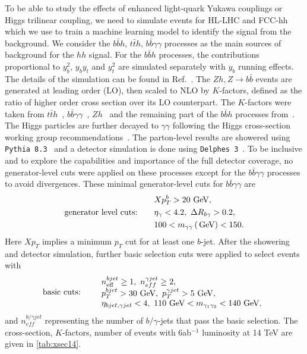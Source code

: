 To be able to study the effects of enhanced light-quark Yukawa couplings or Higgs trilinear coupling, we need to simulate events for HL-LHC and FCC-hh which we use to train a machine learning model to identify the signal from the background. We consider the $b\bar bh$, $t\bar th$, $b\bar b \gamma\gamma$ processes as the main sources of background for the $hh$ signal. For the $b\bar bh$ processes, the contributions proportional to $y_b^2$, $y_by_t$ and $y_t^2$ are simulated separately with $y_b$ running effects. The details of the simulation can be found in Ref.~\cite{Grojean:2020ech}. The $Zh, Z\to b\bar b$ events are generated at leading order (LO), then scaled to NLO by $K$-factors, defined as the ratio of higher order cross section over its LO counterpart. The $K$-factors were taken from $t\bar{t}h$~\cite{Beenakker:2001rj}, $b\bar b \gamma\gamma$~\cite{Fah:2017wlf}, $Zh$~\cite{Campanario:2014lza} and the remaining part of the $b\bar bh$ processes from~\cite{Dawson:2005vi}. The Higgs particles are further decayed to $\gamma\gamma$ following the Higgs cross-section working group recommendations~\cite{LHCHiggsCrossSectionWorkingGroup:2016ypw}. The parton-level results are showered using \texttt{Pythia 8.3}~\cite{Sjostrand:2014zea} and a detector simulation is done using \texttt{Delphes 3}~\cite{deFavereau:2013fsa}. To be inclusive and to explore the capabilities and importance of the full detector coverage, no generator-level cuts were applied on these processes except for the $b\bar b \gamma\gamma$ processes to avoid divergences. These minimal generator-level cuts for $b\bar b\gamma\gamma$ are
\begin{equation}
	\begin{aligned}
		& Xp_T^b>20\,\,\textrm{GeV}, \\
		\textrm{generator level cuts:}\qquad& \eta_\gamma<4.2,~ \Delta R_{b\gamma}>0.2, \\
		& 100< m_{\gamma\gamma} \,(\,\textrm{GeV}) < 150.
	\end{aligned}
\end{equation}
Here $Xp_T$ implies a minimum $p_T$ cut for at least one $b$-jet. 
After the showering and detector simulation, further basic selection cuts were applied to select events with
\begin{equation}
	\textrm{basic cuts:}\qquad
	\begin{array}{l}
		n_{\mathrm{eff}}^{bjet}\geq 1,~n_{eff}^{\gamma jet} \geq 2,\\
		p_T^{bjet}>30\,\,\textrm{GeV},~p_T^{\gamma jet}>5\,\,\textrm{GeV},\\
		\eta_{bjet,\gamma jet}<4,~ 110\, \,\textrm{GeV} < m_{\gamma_1\gamma_2} < 140\,\,\textrm{GeV},
	\end{array}
	\label{eqn:bcuts}
\end{equation}
and $n_{eff}^{b/\gamma jet}$ representing the number of $b/\gamma$-jets that pass the basic selection. The cross-section, $K$-factors, number of events with 6ab$^{-1}$ luminosity at 14 TeV are given in \autoref{tab:xsec14}. 

